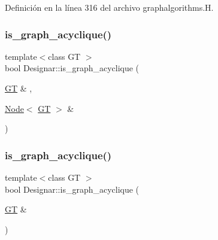 Definición en la línea 316 del archivo graphalgorithms.\+H.

\mbox{\label{namespace_designar_a745761588a29956929fda0d246ebbef5}} 
\subsubsection{\texorpdfstring{is\+\_\+graph\+\_\+acyclique()}{is\_graph\_acyclique()}\hspace{0.1cm}{\footnotesize\ttfamily [1/2]}}
{\footnotesize\ttfamily template$<$class GT $>$ \\
bool Designar\+::is\+\_\+graph\+\_\+acyclique (\begin{DoxyParamCaption}\item[{\hyperlink{demo-buildgraph_8_c_a3001c40d2c31ca87ed96cd7d1334a55e}{GT} \&}]{,  }\item[{\hyperlink{namespace_designar_a5af326c65aa2bd26b26c410f2030d09e}{Node}$<$ \hyperlink{demo-buildgraph_8_c_a3001c40d2c31ca87ed96cd7d1334a55e}{GT} $>$ \&}]{ }\end{DoxyParamCaption})}

\mbox{\label{namespace_designar_a2cf5f0717993e7d2a4dbc26ff8380a72}} 
\subsubsection{\texorpdfstring{is\+\_\+graph\+\_\+acyclique()}{is\_graph\_acyclique()}\hspace{0.1cm}{\footnotesize\ttfamily [2/2]}}
{\footnotesize\ttfamily template$<$class GT $>$ \\
bool Designar\+::is\+\_\+graph\+\_\+acyclique (\begin{DoxyParamCaption}\item[{\hyperlink{demo-buildgraph_8_c_a3001c40d2c31ca87ed96cd7d1334a55e}{GT} \&}]{ }\end{DoxyParamCaption})}

\mbox{\label{namespace_designar_aa57796582cb83d7459c43044ebf15f80}} 
